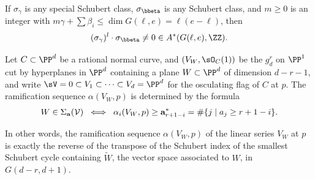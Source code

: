 \begin{corollary}\label{intersection with sigma nonzero}
If $\sigma_\gamma$ is any special Schubert class, $\sigma_{\bbeta}$ is any Schubert class,
and $m\geq 0$ is an integer with $m \gamma + \sum \beta_i \leq \dim G(\ell, e) = \ell(e-\ell)$, then   
$$
(\sigma_\gamma)^l \cdot \sigma_{\bbeta} \neq 0 \in A^*(G(\ell, e), \ZZ).
$$
\end{corollary}

%
%
%
%
\begin{proposition}\label{ramification}
Let $C \subset \PP^d$ be a rational normal curve, and $(V_W, \sO_C(1))$ be the $g^r_d$ on $\PP^1$ cut by hyperplanes in $\PP^d$ containing a plane $W \subset \PP^d$ of dimension $d-r-1$, and write $\sV = 0\subset V_1\subset \cdots \subset V_d = \PP^d$ for the osculating flag of $C$ at $p$. The ramification sequence $\alpha(V_W, p)$
is determined by the formula
%
$$
W \in \Sigma_{\bf a}({\cal V}) \; \iff \; \alpha_i(V_W, p) \geq {\bf a}^*_{r+1-i} = \#\{j\mid a_j\geq r+1-i\}.
$$
\end{proposition} 
\def\tL{{\widetilde W}}
\def\tsV{{\widetilde \sV}}
\def\tV{{\widetilde V}}
In other words, the ramification sequence $\alpha(V_W, p)$ of the linear series $V_W$ at $p$ is exactly the reverse of the transpose of the Schubert index of the smallest Schubert cycle containing $\tL$, the vector
space associated to $W$, in  $G(d-r, d+1)$.

